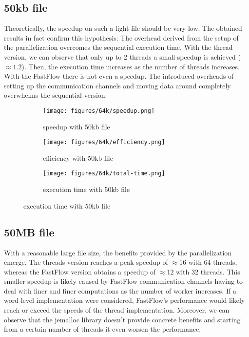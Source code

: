 \documentclass{article}
\begin{document}
\subsection{50kb file}
Theoretically, the speedup on such a light file should be very low.
The obtained results in fact confirm this hypothesis: The overhead derived
from the setup of the parallelization overcomes the sequential execution time.
With the thread version, we can observe that only up to 2 threads a small speedup is achieved ($\approx 1.2$).
Then, the execution time increases as the number of threads increases.
With the FastFlow there is not even a speedup. The introduced overheads of setting
up the communication channels and moving data around completely overwhelms the sequential version.
\begin{figure}[H]
    \begin{subfigure}{0.5\textwidth}
        \centering
        \texttt{[image: figures/64k/speedup.png]}
        \caption{speedup with 50kb file}
    \end{subfigure}
    \begin{subfigure}{0.5\textwidth}
        \centering
        \texttt{[image: figures/64k/efficiency.png]}
        \caption{efficiency with 50kb file}
    \end{subfigure}
    \begin{subfigure}{0.5\textwidth}
        \centering
        \texttt{[image: figures/64k/total-time.png]}
        \caption{execution time with 50kb file}
    \end{subfigure}
\end{figure}

\subsection{50MB file}
With a reasonable large file size, the benefits provided by the parallelization emerge.
The threads version reaches a peak speedup of $\approx 16$ with 64 threads,
whereas the FastFlow version obtains a speedup of $\approx 12$ with 32 threads.
This smaller speedup is likely caused by FastFlow communication channels having to deal with finer and
finer computations as the number of worker increases.
If a word-level implementation were considered, FastFlow's performance would likely reach or exceed the
speeds of the thread implementation.
Moreover, we can observe that the jemalloc library doesn't provide concrete benefits
and starting from a certain number of threads it even worsen the performance.
\end{document}
